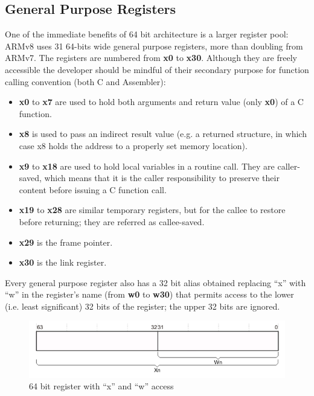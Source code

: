 \documentclass[12pt,a4paper,openright,twoside]{report}
\begin{document}
\subsection{General Purpose Registers}
One of the immediate benefits of 64 bit architecture is a larger register pool:
ARMv8 uses 31 64-bits wide general purpose registers, more than doubling from
ARMv7.
The registers are numbered from \textbf{x0} to \textbf{x30}. Although they are
freely accessible the developer should be mindful of their secondary purpose
for function calling convention (both C and Assembler):
\begin{itemize}
    \item \textbf{x0} to \textbf{x7} are used to hold both arguments and return
        value (only \textbf{x0}) of a C function.
    \item \textbf{x8} is used to pass an indirect result value (e.g. a returned 
        structure, in which case x8 holds the address to a properly set memory
        location).
    \item \textbf{x9} to \textbf{x18} are used to hold local variables in a 
        routine call. They are caller-saved, which means that it is the caller
        responsibility to preserve their content before issuing a C function call.
    \item \textbf{x19} to \textbf{x28} are similar temporary registers, but for 
        the callee to restore before returning; they are referred as callee-saved.
    \item \textbf{x29} is the frame pointer.
    \item \textbf{x30} is the link register.
\end{itemize}
Every general purpose register also has a 32 bit alias obtained replacing ``x''
with ``w'' in the register's name (from \textbf{w0} to \textbf{w30}) that permits
access to the lower (i.e. least significant) 32 bits of the register; the upper 
32 bits are ignored.

\begin{figure}[h]
    \begin{center}
\includegraphics[scale=0.55]{images/tesi8.png}
\caption[32 bit alias]{64 bit register with ``x'' and ``w'' access}\label{fig:32reg}
    \end{center}
\end{figure}
\end{document}

